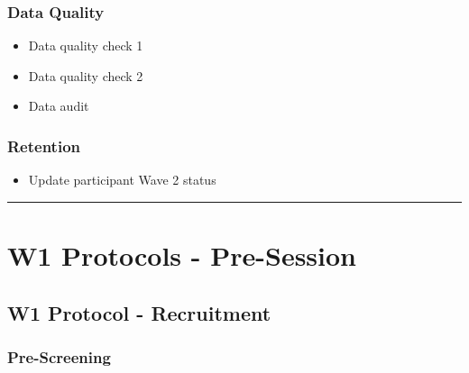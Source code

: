 \documentclass[]{book}
\providecommand{\tightlist}{%
  \setlength{\itemsep}{0pt}\setlength{\parskip}{0pt}}
\begin{document}
\hypertarget{data-quality}{%
\subsubsection{Data Quality}\label{data-quality}}

\begin{itemize}
\tightlist
\item
  Data quality check 1
\item
  Data quality check 2
\item
  Data audit
\end{itemize}

\hypertarget{retention}{%
\subsubsection{Retention}\label{retention}}

\begin{itemize}
\tightlist
\item
  Update participant Wave 2 status
\end{itemize}

\begin{center}\rule{0.5\linewidth}{0.5pt}\end{center}

\hypertarget{w1-protocols---pre-session}{%
\section{W1 Protocols - Pre-Session}\label{w1-protocols---pre-session}}

\hypertarget{w1-protocol---recruitment}{%
\subsection{W1 Protocol - Recruitment}\label{w1-protocol---recruitment}}

\hypertarget{pre-screening}{%
\subsubsection{Pre-Screening}\label{pre-screening}}
\end{document}
